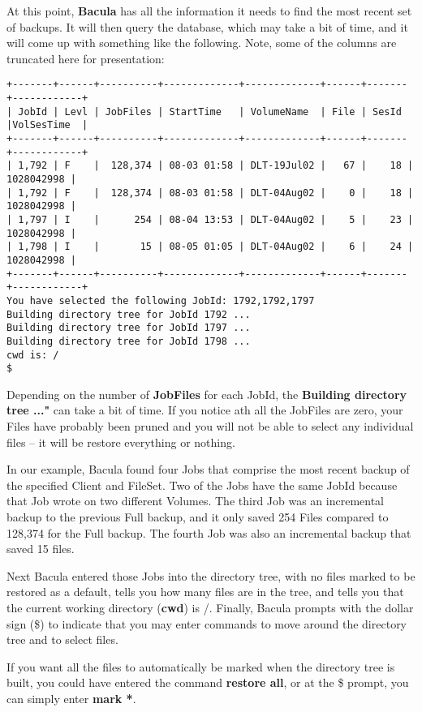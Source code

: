 At this point, {\bf Bacula} has all the information it needs to find the most
recent set of backups. It will then query the database, which may take a bit
of time, and it will come up with something like the following. Note, some of
the columns are truncated here for presentation: 

\footnotesize
\begin{verbatim}
+-------+------+----------+-------------+-------------+------+-------+------------+
| JobId | Levl | JobFiles | StartTime   | VolumeName  | File | SesId |VolSesTime  |
+-------+------+----------+-------------+-------------+------+-------+------------+
| 1,792 | F    |  128,374 | 08-03 01:58 | DLT-19Jul02 |   67 |    18 | 1028042998 |
| 1,792 | F    |  128,374 | 08-03 01:58 | DLT-04Aug02 |    0 |    18 | 1028042998 |
| 1,797 | I    |      254 | 08-04 13:53 | DLT-04Aug02 |    5 |    23 | 1028042998 |
| 1,798 | I    |       15 | 08-05 01:05 | DLT-04Aug02 |    6 |    24 | 1028042998 |
+-------+------+----------+-------------+-------------+------+-------+------------+
You have selected the following JobId: 1792,1792,1797
Building directory tree for JobId 1792 ...
Building directory tree for JobId 1797 ...
Building directory tree for JobId 1798 ...
cwd is: /
$
\end{verbatim}
\normalsize

Depending on the number of {\bf JobFiles} for each JobId, the {\bf Building
directory tree ..."} can take a bit of time. If you notice ath all the
JobFiles are zero, your Files have probably been pruned and you will not be
able to select any individual files -- it will be restore everything or
nothing.

In our example, Bacula found four Jobs that comprise the most recent backup of
the specified Client and FileSet. Two of the Jobs have the same JobId because
that Job wrote on two different Volumes. The third Job was an incremental
backup to the previous Full backup, and it only saved 254 Files compared to
128,374 for the Full backup. The fourth Job was also an incremental backup
that saved 15 files. 

Next Bacula entered those Jobs into the directory tree, with no files marked
to be restored as a default, tells you how many files are in the tree, and
tells you that the current working directory ({\bf cwd}) is /. Finally, Bacula
prompts with the dollar sign (\$) to indicate that you may enter commands to
move around the directory tree and to select files. 
             
If you want all the files to automatically be marked when the directory
tree is built, you could have entered the command {\bf restore all}, or
at the \$ prompt, you can simply enter {\bf mark *}.

